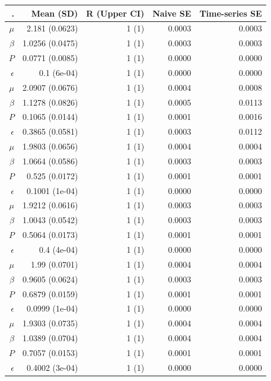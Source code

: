 \documentclass[
  letterpaper,
  double,
  12pt,
  1.0in]{beavtex}
\begin{document}
\begin{table}
{\centering
\begin{tabular}{|r|r|r|r|r|}
  \hline
. & Mean (SD) & R (Upper CI) & Naive SE & Time-series SE \\ 
  \hline
$\mu$ & 2.181 (0.0623) & 1 (1) & 0.0003 & 0.0003 \\ 
  $\beta$ & 1.0256 (0.0475) & 1 (1) & 0.0003 & 0.0003 \\ 
  $P$ & 0.0771 (0.0085) & 1 (1) & 0.0000 & 0.0000 \\ 
  $\epsilon$ & 0.1 (6e-04) & 1 (1) & 0.0000 & 0.0000 \\ 
   \hline 
$\mu$ & 2.0907 (0.0676) & 1 (1) & 0.0004 & 0.0008 \\ 
  $\beta$ & 1.1278 (0.0826) & 1 (1) & 0.0005 & 0.0113 \\ 
  $P$ & 0.1065 (0.0144) & 1 (1) & 0.0001 & 0.0016 \\ 
  $\epsilon$ & 0.3865 (0.0581) & 1 (1) & 0.0003 & 0.0112 \\ 
   \hline 
$\mu$ & 1.9803 (0.0656) & 1 (1) & 0.0004 & 0.0004 \\ 
  $\beta$ & 1.0664 (0.0586) & 1 (1) & 0.0003 & 0.0003 \\ 
  $P$ & 0.525 (0.0172) & 1 (1) & 0.0001 & 0.0001 \\ 
  $\epsilon$ & 0.1001 (1e-04) & 1 (1) & 0.0000 & 0.0000 \\ 
   \hline 
$\mu$ & 1.9212 (0.0616) & 1 (1) & 0.0003 & 0.0003 \\ 
  $\beta$ & 1.0043 (0.0542) & 1 (1) & 0.0003 & 0.0003 \\ 
  $P$ & 0.5064 (0.0173) & 1 (1) & 0.0001 & 0.0001 \\ 
  $\epsilon$ & 0.4 (4e-04) & 1 (1) & 0.0000 & 0.0000 \\ 
   \hline 
$\mu$ & 1.99 (0.0701) & 1 (1) & 0.0004 & 0.0004 \\ 
  $\beta$ & 0.9605 (0.0624) & 1 (1) & 0.0003 & 0.0003 \\ 
  $P$ & 0.6879 (0.0159) & 1 (1) & 0.0001 & 0.0001 \\ 
  $\epsilon$ & 0.0999 (1e-04) & 1 (1) & 0.0000 & 0.0000 \\ 
   \hline 
$\mu$ & 1.9303 (0.0735) & 1 (1) & 0.0004 & 0.0004 \\ 
  $\beta$ & 1.0389 (0.0704) & 1 (1) & 0.0004 & 0.0004 \\ 
  $P$ & 0.7057 (0.0153) & 1 (1) & 0.0001 & 0.0001 \\ 
  $\epsilon$ & 0.4002 (3e-04) & 1 (1) & 0.0000 & 0.0000 \\ 
   \hline
\end{tabular}
 
 

}

\end{table}%
\end{document}
